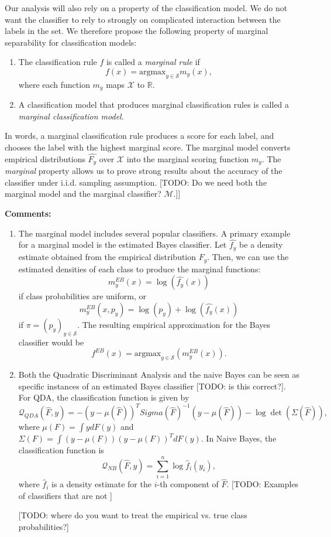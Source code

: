 \documentclass[12pt]{article}
\begin{document}
Our analysis will also rely on a property of the classification model. We do not want the classifier to rely to strongly on complicated interaction between the labels in the set. We therefore propose the following property of marginal separability for classification models: 

\begin{definition}
\begin{enumerate}
\item The classification rule $f$ is called a \emph{marginal rule} if 
\[
f(x) = \text{argmax}_{y \in \mathcal{S}} m_y(x),
\]
where each function $m_y$ maps $\mathcal{X}$ to $\mathbb{R}$.
\item A classification model that produces marginal classification rules is called a \emph{marginal classification model}. 
\end{enumerate}
\end{definition}
In words, a marginal classification rule produces a score for each label, and chooses the label with the highest marginal score. The marginal model converts empirical
distributions $\hat{F_y}$ over $\mathcal{X}$ into the marginal scoring function $m_y$. 
The \emph{marginal} property allows us to prove strong results about
the accuracy of the classifier under i.i.d. sampling
assumption.
[TODO: Do we need both the marginal model and the marginal classifier? $\mathcal{M}$.]]

\textbf{Comments:}
\begin{enumerate}
\item The marginal model includes several popular classifiers.
A primary example for a marginal model is the estimated Bayes classifier. Let $\hat{f_y}$ be a density estimate obtained from the empirical distribution $\hat{F_y}$. Then,
we can use the estimated densities of each class to produce the marginal functions:
\[ m^{EB}_y(x) = \log(\hat{f_{y}}(x))\]
if class probabilities are uniform, or 
\[m^{EB}_y(x,p_y) = \log(p_y) + \log(\hat{f_y}(x))\]
if $\pi = (p_y)_{y \in \mathcal{S}}$.
The resulting empirical approximation for the Bayes classifier
would be 
\[ f^{EB}(x) = \text{argmax}_{y \in \mathcal{S}}(m^{EB}_y(x)).\]
\item Both the Quadratic Discriminant Analysis and the naive Bayes can be seen as specific instances of an estimated Bayes classifier [TODO: is this correct?]. 
 For QDA, the classification function is
given by
\[
\mathcal{Q}_{QDA}(\hat{F}, y) = -(y - \mu(\hat{F}))^T Sigma(\hat{F})^{-1} (y-\mu(\hat{F})) - \log\det(\Sigma(\hat{F})),
\]
where $\mu(F) = \int y dF(y)$ and $\Sigma(F) = \int (y-\mu(F))(y-\mu(F))^T dF(y)$.
In Naive Bayes, the classification function is
\[
\mathcal{Q}_{NB}(\hat{F},  y) = \sum_{i=1}^n \log \hat{f}_i(y_i),
\]
where $\hat{f}_i$ is a density estimate for the $i$-th component of
$\hat{F}$.
[TODO: Examples of classifiers that are not ]
\item[] [TODO: where do you want to treat the empirical vs. true class probabilities?]
\end{enumerate}
\end{document}
